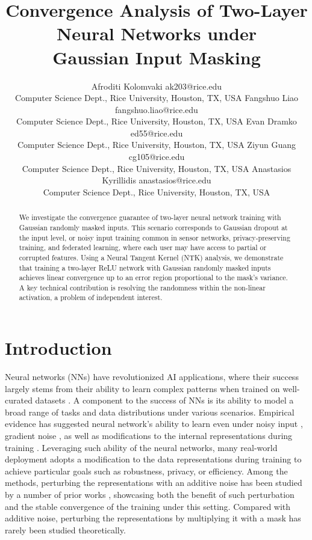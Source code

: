 \documentclass[10pt]{article} %
\title{Convergence Analysis of Two-Layer Neural Networks under\\ Gaussian Input Masking}
\author{
   \name \!\!Afroditi Kolomvaki \email ak203@rice.edu \\
   \addr Computer Science Dept., Rice University, Houston, TX, USA
   \AND
   \name Fangshuo Liao \email fangshuo.liao@rice.edu \\
   \addr Computer Science Dept., Rice University, Houston, TX, USA
   \AND
   \name Evan Dramko \email ed55@rice.edu \\
   \addr Computer Science Dept., Rice University, Houston, TX, USA
   \AND
   \name Ziyun Guang \email cg105@rice.edu \\
   \addr Computer Science Dept., Rice University, Houston, TX, USA
   \AND
   \name Anastasios Kyrillidis \email anastasios@rice.edu \\
   \addr Computer Science Dept., Rice University, Houston, TX, USA
 }
\theoremstyle{definition}
\theoremstyle{plain}
\begin{document}
\maketitle
\begin{abstract}
We investigate the convergence guarantee of two-layer neural network training with Gaussian randomly masked inputs. This scenario corresponds to Gaussian dropout at the input level, or noisy input training common in sensor networks, privacy-preserving training, and federated learning, where each user may have access to partial or corrupted features. Using a Neural Tangent Kernel (NTK) analysis, we demonstrate that training a two-layer ReLU network with Gaussian randomly masked inputs achieves linear convergence up to an error region proportional to the mask's variance. A key technical contribution is resolving the randomness within the non-linear activation, a problem of independent interest.
\end{abstract}
\section{Introduction}
\label{sec:intro}
Neural networks (NNs) have revolutionized AI applications, where their success largely stems from their ability to learn complex patterns when trained on well-curated datasets \citep{schuhmann2022laion,li2023textbooks, gunasekar2023textbooks, edwards2024data}. 
A component to the success of NNs is its ability to model a broad range of tasks and data distributions under various scenarios. Empirical evidence has suggested neural network's ability to learn even under noisy input \citep{kariotakis2024leveraging}, gradient noise \citep{ruder2017overviewgradientdescentoptimization}, as well as modifications to the internal representations during training \citep{srivastava2014dropout,yuan2022distributed}. Leveraging such ability of the neural networks, many real-world deployment adopts a modification to the data representations during training to achieve particular goals such as robustness, privacy, or efficiency. Among the methods, perturbing the representations with an additive noise has been studied by a number of prior works \citep{gao2019convergenceadversarialtrainingoverparametrized,li2025distributionallyrobustoptimizationadversarial,li2023rethinking, madry2018towards, loo2022evolution, tsilivis2022can, ilyas2019adversarial}, showcasing both the benefit of such perturbation and the stable convergence of the training under this setting. Compared with additive noise, perturbing the representations by multiplying it with a mask has rarely been studied theoretically.  
\end{document}
